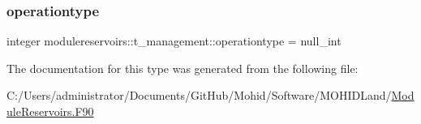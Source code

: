 \mbox{\label{structmodulereservoirs_1_1t__management_a117b5ce08c6b77cc69b9cb5717e2f357}} 
\subsubsection{\texorpdfstring{operationtype}{operationtype}}
{\footnotesize\ttfamily integer modulereservoirs\+::t\+\_\+management\+::operationtype = null\+\_\+int\hspace{0.3cm}{\ttfamily [private]}}



The documentation for this type was generated from the following file\+:\begin{DoxyCompactItemize}
\item 
C\+:/\+Users/administrator/\+Documents/\+Git\+Hub/\+Mohid/\+Software/\+M\+O\+H\+I\+D\+Land/\mbox{\hyperlink{_module_reservoirs_8_f90}{Module\+Reservoirs.\+F90}}\end{DoxyCompactItemize}
